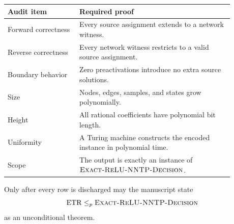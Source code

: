 \begin{center}
\begin{tabular}{>{\raggedright\arraybackslash}p{0.28\linewidth}>{\raggedright\arraybackslash}p{0.60\linewidth}}
\toprule
Audit item & Required proof\\
\midrule
Forward correctness & Every source assignment extends to a network witness.\\
Reverse correctness & Every network witness restricts to a valid source assignment.\\
Boundary behavior & Zero preactivations introduce no extra source solutions.\\
Size & Nodes, edges, samples, and states grow polynomially.\\
Height & All rational coefficients have polynomial bit length.\\
Uniformity & A Turing machine constructs the encoded instance in polynomial time.\\
Scope & The output is exactly an instance of \(\textnormal{\textsc{Exact-ReLU-NNTP-Decision}}\).\\
\bottomrule
\end{tabular}
\end{center}

Only after every row is discharged may the manuscript state
\begin{equation}
  \mathrm{ETR}\le_p\textnormal{\textsc{Exact-ReLU-NNTP-Decision}}
\end{equation}
as an unconditional theorem.
